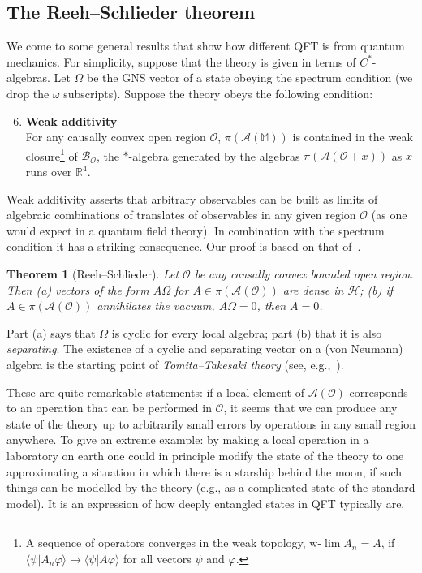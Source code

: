 \documentclass[12pt,a4paper]{article}
\newcommand{\1}{\mathds{1}}                         %
\newcommand{\RR}{\mathbb{R}}           %
\newcommand{\Ocal}{\mathcal{O}}
\newcommand{\MM}{\mathbb{M}}
\newcommand{\HH}{{\mathcal{H}}}
\newcommand{\Ac}{{\mathcal{A}}}
\newcommand{\Bc}{{\mathcal{B}}}
\newcommand{\ip}[2]{\langle #1|#2\rangle}
\newtheorem{theorem}{Theorem}%
\begin{document}
\subsection{The Reeh--Schlieder theorem} We come to some general results that show how different
QFT is from quantum mechanics. For simplicity, suppose that the theory is given in terms of $C^*$-algebras. Let $\Omega$ be the GNS vector of a state obeying the spectrum condition (we drop the $\omega$ subscripts). Suppose the theory obeys the following condition: 
\begin{enumerate}[label=\bf A\arabic{enumi},leftmargin=*,widest=4]\setcounter{enumi}{5}
	\item {\bf Weak additivity}\\
	For any causally convex open region $\Ocal$,  $\pi(\Ac(\MM))$ is contained in the weak closure\footnote{A sequence of operators converges in the weak topology, $\text{w-}\lim A_n = A$, if $\ip{\psi}{A_n\varphi}\to \ip{\psi}{A\varphi}$ for all vectors $\psi$ and $\varphi$.}  of $\Bc_\Ocal$, the $*$-algebra generated by the algebras $\pi(\Ac(\Ocal+x))$ as $x$ runs over $\RR^4$. 
\end{enumerate}
Weak additivity asserts that arbitrary observables can be built as limits of
algebraic combinations of translates of 
observables in any given region $\Ocal$ (as one would expect in a quantum field theory). In combination with
the spectrum condition it has a striking consequence. Our proof is based on that of~\cite{Araki}.

\begin{theorem}[Reeh--Schlieder] Let $\Ocal$ be any causally convex bounded open region. Then (a)
	vectors of the form $A\Omega$ for $A\in\pi(\Ac(\Ocal))$ are dense in $\HH$; (b) if $A\in\pi(\Ac(\Ocal))$ annihilates the vacuum, $A\Omega=0$, then $A=0$. 
\end{theorem}
Part (a) says that $\Omega$ is cyclic for every local algebra; part (b) that it is also \emph{separating}. The existence of a cyclic and separating vector on a (von Neumann) algebra is the starting point of \emph{Tomita--Takesaki theory} (see, e.g.,~\cite{BratRob:vol1}). 

These are quite remarkable statements: if a local element of $\Ac(\Ocal)$ corresponds to an operation that can be performed in $\Ocal$, it seems that we can produce any state of the theory up to arbitrarily small errors by operations in any small region anywhere. To give an extreme example: by making a local operation in a laboratory on earth one could in principle modify the state of the theory to one approximating a situation in which there is a starship behind the moon, if such things can be modelled by the theory (e.g., as a complicated state of the standard model). It is an expression of how deeply entangled states in QFT typically are.  
\end{document}
